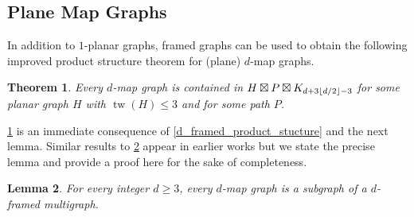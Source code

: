 \documentclass{patmorin}
\theoremstyle{plain}
\newtheorem{thm}{Theorem}
\newtheorem{lem}[thm]{Lemma}
\theoremstyle{definition}
\DeclareMathOperator{\tw}{tw}
\DeclarePairedDelimiter{\floor}{\lfloor}{\rfloor}
\renewcommand{\geq}{\geqslant}
\renewcommand{\leq}{\leqslant}
\begin{document}
\subsection{Plane Map Graphs}

In addition to $1$-planar graphs, framed graphs can be used to obtain the following improved product structure theorem for (plane) $d$-map graphs.

\begin{thm}
\label{dMapProduct}
Every $d$-map graph is contained in $H \boxtimes P \boxtimes K_{ d + 3\floor{d/2} -3 }$ for some planar graph $H$ with $\tw(H) \leq 3$ and for some path $P$.
\end{thm}

\cref{dMapProduct} is an immediate consequence of \cref{d_framed_product_stucture} and the next lemma. Similar results to \cref{MewMapGraphLemma} appear in earlier works \cite{CGP06,BDGGMR,Brandenburg19,Brandenburg20} but we state the precise lemma and provide a proof here for the sake of completeness.


\begin{lem}
\label{MewMapGraphLemma}
For every integer $d\geq 3$, every $d$-map graph is a subgraph of a $d$-framed multigraph.
\end{lem}
\end{document}
